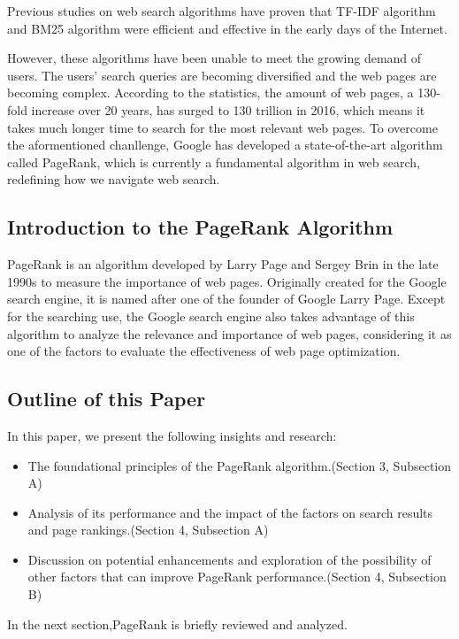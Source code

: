 \documentclass[lettersize,journal,12pt]{IEEEtran}
\begin{document}
Previous studies on web search algorithms have proven that TF-IDF algorithm and BM25 algorithm were efficient and effective in the early days of the Internet. 

However, these algorithms have been unable to meet the growing demand of users. 
The users' search queries are becoming diversified and the web pages are becoming complex.
According to the statistics, the amount of web pages, a 130-fold increase over 20 years, has surged to 130 trillion in 2016, which means it takes much longer time to search for the most relevant web pages.
To overcome the aformentioned chanllenge, Google has developed a state-of-the-art algorithm called PageRank, which is currently a fundamental algorithm in web search, redefining how we navigate web search.

\subsection{Introduction to the PageRank Algorithm} 

PageRank is an algorithm developed by Larry Page and Sergey Brin in the late 1990s to measure the importance of web pages. 
Originally created for the Google search engine, it is named after one of the founder of Google Larry Page. Except for the searching use, the Google search engine also takes advantage of this algorithm to analyze the relevance and importance of web pages, considering it as one of the factors to evaluate the effectiveness of web page optimization. 

\subsection{Outline of this Paper}

In this paper, we present the following insights and research:
\begin{itemize}
	\item The foundational principles of the PageRank algorithm.(Section 3, Subsection A)
	\item Analysis of its performance and the impact of the factors on search results and page rankings.(Section 4, Subsection A)
	\item Discussion on potential enhancements and exploration of the possibility of other factors that can improve PageRank performance.(Section 4, Subsection B)
\end{itemize}

In the next section,PageRank is briefly reviewed and analyzed.
\end{document}
